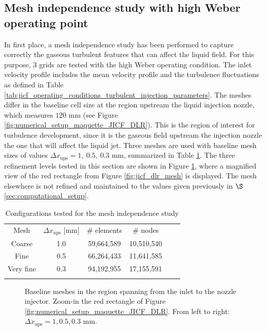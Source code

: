 \subsection{Mesh independence study with high Weber operating point}

In first place, a mesh independence study has been performed to capture correctly the gaseous turbulent features that can affect the liquid field. For this purpose, 3 grids are tested with the high Weber operating condition. The inlet velocity profile includes the mean velocity profile and the turbulence fluctuations as defined in Table \ref{tab:jicf_operating_conditions_turbulent_injection_parameters}. The meshes differ in the baseline cell size at the region upstream the liquid injection nozzle, which measures $120$ mm (see Figure \ref{fig:numerical_setup_maquette_JICF_DLR}). This is the region of interest for turbulence development, since it is the gaseous field upstream the injection nozzle the one that will affect the liquid jet. Three meshes are used with baseline mesh sizes of values $\Delta x_\mathrm{ups} = 1, ~0.5, ~0.3$ mm, summarized in Table \ref{tab:jicf_mesh_independence_gaseous_study}. The three refinement levels tested in this section are shown in Figure \ref{fig:ics_mesh_independency_study_up_meshes}, where a magnified view of the red rectangle from Figure \ref{fig:jicf_dlr_mesh} is displayed. The mesh elsewhere is not refined and maintained to the values given previously in $\S$\ref{sec:computational_setup}. %

\begin{table}[!h]
\centering
\caption{Configurations tested for the mesh independence study}
\begin{tabular}{cccccc}
\thickhline
Mesh & $\Delta x_\mathrm{ups}$ [mm] &  $\#$ elements & $\#$ nodes \\ %
\thickhline
Coarse & 1.0 & 59,664,589 & 10,510,540 \\
Fine & 0.5 & 66,264,433 & 11,641,585 \\
Very fine & 0.3 & 94,192,955 & 17,155,591 \\
\thickhline
\end{tabular}
\label{tab:jicf_mesh_independence_gaseous_study}
\end{table}

\begin{figure}[ht]
\centering
{}
\caption[Baseline meshes in the region spanning from the inlet to the nozzle injector]{Baseline meshes in the region spanning from the inlet to the nozzle injector. Zoom-in the red rectangle of Figure \ref{fig:numerical_setup_maquette_JICF_DLR}. From left to right: $\Delta x_\mathrm{ups} = 1, 0.5, 0.3$ mm.}
\label{fig:ics_mesh_independency_study_up_meshes}
\end{figure}


